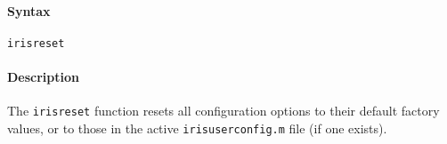


	\paragraph{Syntax}\label{syntax}

\begin{verbatim}
irisreset
\end{verbatim}

\paragraph{Description}\label{description}

The \texttt{irisreset} function resets all configuration options to
their default factory values, or to those in the active
\texttt{irisuserconfig.m} file (if one exists).


